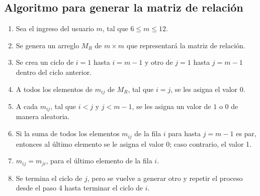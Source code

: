 \documentclass[12pt]{article}
\begin{document}
\subsection{Algoritmo para generar la matriz de relaci\'{o}n}
\begin{enumerate}
\item Sea el ingreso del usuario $m$, tal que $6\leq m\leq 12$.
\item Se genera un arreglo $M_{R}$ de $m \times m$ que representar\'{a} la matriz de relaci\'{o}n.
\item Se crea un ciclo de $i=1$ hasta $i=m-1$ y otro de $j=1$ hasta $j=m-1$ dentro del ciclo anterior.
\item A todos los elementos de $m_{ij}$ de $M_{R}$, tal que $i=j$, se les asigna el valor $0$.
\item A cada $m_{ij}$, tal que $i<j$ y $j<m-1$, se les asigna un valor de $1$ o $0$ de manera aleatoria.
\item Si la suma de todos los elementos $m_{ij}$ de la fila $i$ para hasta $j=m-1$ es par, entonces al \'{u}ltimo elemento se le asigna el valor 0; caso contrario, el valor 1.
\item $m_{ij}=m_{ji}$, para el \'{u}ltimo elemento de la fila $i$.
\item Se termina el ciclo de $j$, pero se vuelve a generar otro y repetir el proceso desde el paso 4 hasta terminar el ciclo de $i$.
\end{enumerate}
\end{document}
